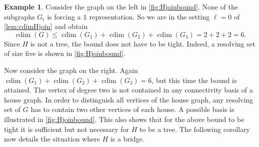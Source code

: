 \documentclass[letterpaper,12pt,headings=normal,parskip=half]{scrartcl}
\DeclareMathOperator{\cdim}{cdim}
\theoremstyle{definition}
\newtheorem{example}[theorem]{Example}
\begin{document}
\begin{example}
    Consider the graph on the left in \cref{fig:Hjoinbound}. None of the subgraphs $G_i$ is forcing a $\mathds{1}$ representation. So we are in the setting $\ell=0$ of \cref{lem:cdimHjoin} and obtain
    \begin{equation*}
        \cdim(G)\leq\cdim(G_1)+\cdim(G_2)+\cdim(G_3)=2+2+2=6.
    \end{equation*}
    Since $H$ is not a tree, the bound does not have to be tight. Indeed, a resolving set of size five is shown in \cref{fig:Hjoinbound}.
    
    Now consider the graph on the right.
    Again $\cdim(G_1)+\cdim(G_2)+\cdim(G_3)=6$, but this time the bound is attained. 
    The vertex of degree two is not contained in any connectivity basis of a house graph.
    In order to distinguish all vertices of the house graph, any resolving set of $G$ has to contain two other vertices of each house.
    A possible basis is illustrated in \cref{fig:Hjoinbound}.
    This also shows that for the above bound to be tight it is sufficient but not necessary for $H$ to be a tree. The following corollary now details the situation where $H$ is a bridge.

\begin{figure}
\centering
\begin{minipage}{.5\textwidth}
\centering
{}
\end{minipage}
\end{figure}
\end{example}
\end{document}
